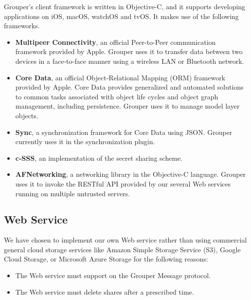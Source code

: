 \documentclass{sig-alternate-05-2015}
\begin{document}
Grouper's client framework is written in Objective-C, and it supports developing applications on iOS, macOS, watchOS and tvOS.
It makes use of the following frameworks.   

\begin{itemize}[leftmargin=7mm]
	\setlength{\itemsep}{1pt}
	\setlength{\parskip}{0pt}
	\setlength{\parsep}{0pt}
	\item 
	\textbf{Multipeer Connectivity}\cite{mc}, an official Peer-to-Peer communication framework provided by Apple. 
	Grouper uses it to transfer data between two devices in a face-to-face manner using a wireless LAN or Bluetooth network.
	\item 
	\textbf{Core Data}\cite{coredata}, an official Object-Relational Mapping (ORM) framework provided by Apple.
	Core Data provides generalized and automated solutions to common tasks associated with object life cycles and object graph management, including persistence. 
	Grouper uses it to manage model layer objects. 
	\item 
	\textbf{Sync}\cite{sync}, a synchronization framework for Core Data using JSON.
	Grouper currently uses it in the synchronization plugin.
	\item 
	\textbf{c-SSS}\cite{c-sss}, an implementation of the secret sharing scheme.
	\item 
	\textbf{AFNetworking}\cite{afnetworking}, a networking library in the Objective-C language. 
	Grouper uses it to invoke the RESTful API provided by our several Web services running on multiple untrusted servers. 
\end{itemize}

\subsection{Web Service}

We have chosen to implement our own Web service rather than using commercial general cloud storage services like Amazon Simple Storage Service (S3), Google Cloud Storage, or Microsoft Azure Storage for the following reasons:

\begin{itemize}[leftmargin=7mm]
	\setlength{\itemsep}{1pt}
	\setlength{\parskip}{0pt}
	\setlength{\parsep}{0pt}
	\item The Web service must support on the Grouper Message protocol.
	\item The Web service must delete shares after a prescribed time.
\end{itemize}
\end{document}
